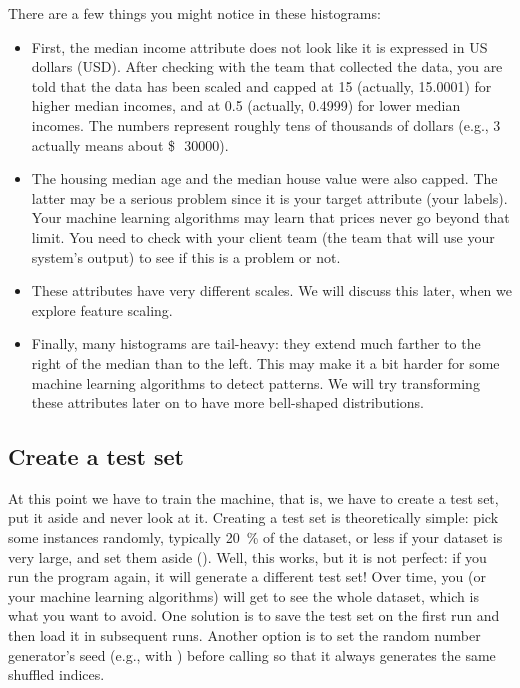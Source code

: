 There are a few things you might notice in these histograms:
\begin{itemize}
\item First, the median income attribute does not look like it is expressed in US dollars (USD). After checking with the team that collected the data, you are told that the data has been scaled and capped at 15 (actually, 15.0001) for higher median incomes, and at 0.5 (actually, 0.4999) for lower median incomes. The numbers represent roughly
tens of thousands of dollars (e.g., 3 actually means about \SI{30000}[\$\,]{}).
\item The housing median age and the median house value were also capped. The latter may be a serious problem since it is your target attribute (your labels). Your machine learning algorithms may learn that prices never go beyond that limit. You need to check with your client team (the team that will use your system's output) to see if this is a problem or not.
\item These attributes have very different scales. We will discuss this later, when we explore feature scaling.
\item Finally, many histograms are tail-heavy: they extend much farther to the right of the median than to the left. This may make it a bit harder for some machine learning algorithms to detect patterns. We will try transforming these attributes later on to have more bell-shaped distributions.
\end{itemize}
\subsection{Create a test set}
At this point we have to train the machine, that is, we have to create a test set, put it aside and never look at it. Creating a test set is theoretically simple: pick some instances randomly, typically \SI{20}{\percent} of the dataset, or less if your dataset is very large, and set them aside (). Well, this works, but it is not perfect: if you run the program again, it will generate a different test set! Over time, you (or your machine learning algorithms) will get to see the whole dataset, which is what you want to avoid. One solution is to save the test set on the first run and then load it in subsequent runs. Another option is to set the random number generator's seed (e.g., with ) before calling  so that it always generates the same shuffled indices.

